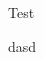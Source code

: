 \documentclass[a4paper,12pt]{article}
\begin{document}
Test


\begin{beispiel}{36} %
dasd
\end{beispiel}
\newpage

%
\end{document}
